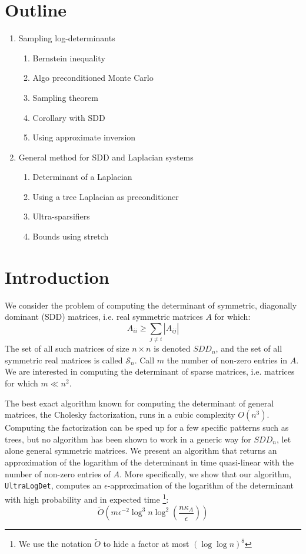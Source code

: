 
\section*{Outline}
\begin{enumerate}
\item Sampling log-determinants

\begin{enumerate}
\item Bernstein inequality 
\item Algo preconditioned Monte Carlo 
\item Sampling theorem 
\item Corollary with SDD 
\item Using approximate inversion 
\end{enumerate}
\item General method for SDD and Laplacian systems

\begin{enumerate}
\item Determinant of a Laplacian 
\item Using a tree Laplacian as preconditioner 
\item Ultra-sparsifiers 
\item Bounds using stretch 
\end{enumerate}
\end{enumerate}

\section{Introduction}

We consider the problem of computing the determinant of symmetric,
diagonally dominant (SDD) matrices, i.e. real symmetric matrices $A$
for which: 
\[
A_{ii}\geq\sum_{j\neq i}\left|A_{ij}\right|
\]
The set of all such matrices of size $n\times n$ is denoted $SDD_{n}$,
and the set of all symmetric real matrices is called $\mathcal{S}_{n}$.
Call $m$ the number of non-zero entries in $A$. We are interested
in computing the determinant of sparse matrices, i.e. matrices for
which $m\ll n^{2}$.

The best exact algorithm known for computing the determinant of general
matrices, the Cholesky factorization, runs in a cubic complexity $O\left(n^{3}\right)$.
Computing the factorization can be sped up for a few specific patterns
such as trees, but no algorithm has been shown to work in a generic
way for $SDD_{n}$, let alone general symmetric matrices. We present
an algorithm that returns an approximation of the logarithm of the
determinant in time quasi-linear with the number of non-zero entries
of $A$. More specifically, we show that our algorithm, \texttt{UltraLogDet},
computes an $\epsilon$-approximation of the logarithm of the determinant
with high probability and in expected time%
\footnote{We use the notation $\tilde{O}$ to hide a factor at most $\left(\log\log n\right)^{8}$%
}: 
\[
\tilde{O}\left(m\epsilon^{-2}\log^{3}n\log^{2}\left(\frac{n\kappa_{A}}{\epsilon}\right)\right)
\]


